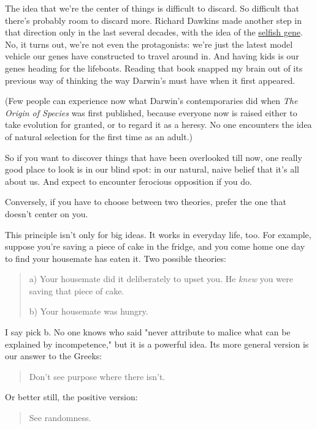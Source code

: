 The
                  idea that we're the center of things is difficult to discard.
                  So difficult that there's probably room to discard more.
                  Richard Dawkins made another step in that direction only in
                  the last several decades, with the idea of the
                  \href{http://en.wikipedia.org/wiki/The\_Selfish\_Gene}{selfish gene}. No, it turns out, we're not even the protagonists: we're
                  just the latest model vehicle our genes have constructed to
                  travel around in. And having kids is our genes heading for the
                  lifeboats. Reading that book snapped my brain out of its
                  previous way of thinking the way Darwin's must have when it
                  first appeared.

(Few people can experience now what
                  Darwin's contemporaries did when
                  \emph{The Origin of Species} was first published, because
                  everyone now is raised either to take evolution for granted,
                  or to regard it as a heresy. No one encounters the idea of
                  natural selection for the first time as an adult.)

So
                  if you want to discover things that have been overlooked till
                  now, one really good place to look is in our blind spot: in
                  our natural, naive belief that it's all about us. And expect
                  to encounter ferocious opposition if you do.

Conversely,
                  if you have to choose between two theories, prefer the one
                  that doesn't center on you.

This principle isn't
                  only for big ideas. It works in everyday life, too. For
                  example, suppose you're saving a piece of cake in the fridge,
                  and you come home one day to find your housemate has eaten it.
                  Two possible theories:
                  \begin{quote}

                    a) Your housemate did it deliberately to upset you. He
                    \emph{knew} you were saving that piece of cake.

b)
                    Your housemate was hungry.
                  
\end{quote}

                  I say pick b. No one knows who said "never attribute to malice
                  what can be explained by incompetence," but it is a powerful
                  idea. Its more general version is our answer to the Greeks:
                  \begin{quote}
Don't see purpose where there isn't.
\end{quote}

                  Or better still, the positive version:
                  \begin{quote}
See randomness.
\end{quote}

                  


              
            
          
